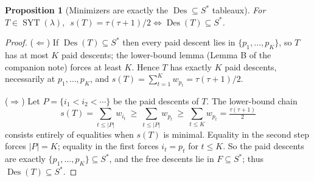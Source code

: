 \documentclass[11pt]{article}
\newtheorem{proposition}{Proposition}
\theoremstyle{remark}
\newcommand{\Des}{\operatorname{Des}}
\newcommand{\SYT}{\operatorname{SYT}}
\begin{document}
\begin{proposition}[Minimizers are exactly the $\Des\subseteq S^{*}$ tableaux]
For $T\in\SYT(\lambda)$, $\;s(T)=\tau(\tau+1)/2\iff \Des(T)\subseteq S^{*}$.
\end{proposition}
\begin{proof}
($\Leftarrow$) If $\Des(T)\subseteq S^{*}$ then every paid descent lies in $\{p_1,\dots,p_K\}$, so $T$ has at most $K$ paid descents; the lower-bound lemma (Lemma B of the companion note) forces at least $K$. Hence $T$ has exactly $K$ paid descents, necessarily at $p_1,\dots,p_K$, and $s(T)=\sum_{t=1}^K w_{p_t}=\tau(\tau+1)/2$.

($\Rightarrow$) Let $P=\{i_1<i_2<\cdots\}$ be the paid descents of $T$. The lower-bound chain
\[
s(T)=\sum_{t\le|P|}w_{i_t}\ \ge\ \sum_{t\le|P|}w_{p_t}\ \ge\ \sum_{t\le K}w_{p_t}=\tfrac{\tau(\tau+1)}{2}
\]
consists entirely of equalities when $s(T)$ is minimal. Equality in the second step forces $|P|=K$; equality in the first forces $i_t=p_t$ for $t\le K$. So the paid descents are exactly $\{p_1,\dots,p_K\}\subseteq S^{*}$, and the free descents lie in $F\subseteq S^{*}$; thus $\Des(T)\subseteq S^{*}$.
\end{proof}
\end{document}
